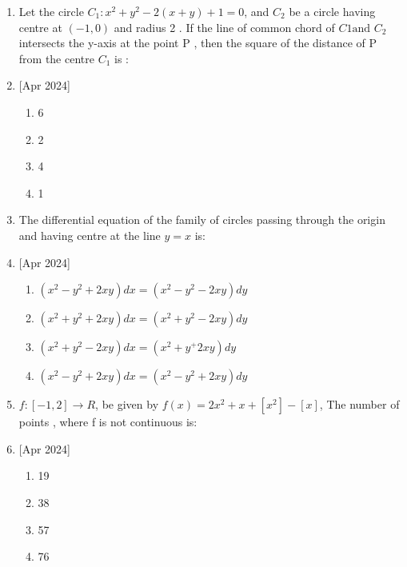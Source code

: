 \documentclass[journal]{IEEEtran}
\begin{document}
\begin{enumerate}
    \item Let the circle $C_1: x^2+y^2-2(x+y)+1=0$, and $C_2$ be a circle having centre at $(-1,0)$ and radius 2 . If the line of common chord of $C1 \text{and } C_2$ intersects the y-axis at the point P , then the square of the distance of P from the centre $C_1$ is :
     \item{[Apr 2024]}
    \begin{multicols}{4}
            \begin{enumerate}
              \item 6
              \item 2
              \item 4
              \item 1
            \end{enumerate}
        \end{multicols}
    
    

    \item The differential equation of the family of circles passing through the origin and having centre at the line $y=x$ is:
     \item{[Apr 2024]}
    \begin{multicols}{2}
            \begin{enumerate}
             \item $(x^2-y^2+2xy)dx=(x^2-y^2-2xy)dy$
              \item $(x^2+y^2+2xy)dx=(x^2+y^2-2xy)dy$
               \item $(x^2+y^2-2xy)dx=(x^2+y^+2xy)dy$
                \item $(x^2-y^2+2xy)dx=(x^2-y^2+2xy)dy$
            \end{enumerate}
        \end{multicols}
    \item $f:[-1,2]\rightarrow R$, be given by $f(x)=2x^2+x+[x^2]-[x]$, The number of points , where f is  not continuous is:
     \item{[Apr 2024]}
    \begin{multicols}{4}
            \begin{enumerate}
        
              \item 19
              \item 38
              \item 57
              \item 76
            \end{enumerate}
        \end{multicols}
    

\end{enumerate}
\end{document}
